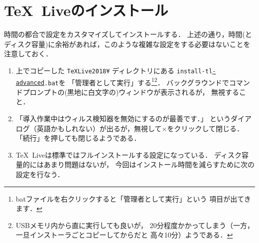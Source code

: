 \documentclass{ltjsarticle}
\begin{document}
\newpage
\section{\TeX~Liveのインストール}
時間の都合で設定をカスタマイズしてインストールする．
上述の通り，時間(とディスク容量)に余裕があれば，このような複雑な設定をする必要はないことを注意しておく．
\begin{enumerate}
  \itemsep\medskipamount


\item 上でコピーした \texttt{TeXLive2018¥} ディレクトリにある
  \texttt{install-tl\underline{-advanced}.bat}を
  「管理者として実行」する\footnote{%
    batファイルを右クリックすると「管理者として実行」という
    項目が出てきます．
  }\footnote{%
    USBメモリ内から直に実行しても良いが，
    20分程度かかってしまう（一方，一旦インストーラごとコピーしてからだと
    高々10分）ようである．
  }．
  \smallskip
  バックグラウンドでコマンドプロンプトの(黒地に白文字の)ウィンドウが表示されるが，
  無視すること．

\item 「導入作業中はウィルス検知器を無効にするのが最善です．」
  というダイアログ（英語かもしれない）が出るが，無視して×をクリックして閉じる．
  「続行」を押しても閉じるようである．

\item \TeX~Liveは標準ではフルインストールする設定になっている．
  ディスク容量的にはあまり問題はないが，
  今回はインストール時間を減らすために次の設定を行なう．


\end{enumerate}
\end{document}
